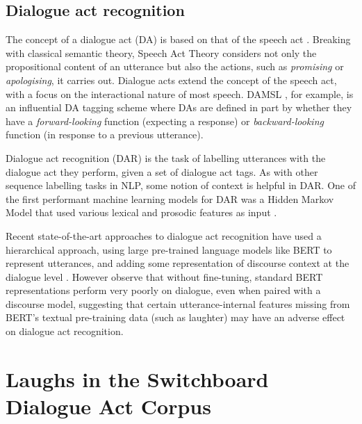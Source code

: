 \documentclass[11pt,a4paper]{article}
\begin{document}

\subsection{Dialogue act recognition}
\label{sec:dial-act-recogn}

The concept of a dialogue act (DA) is based on that of the speech act
\citep{austin1975things}. %
Breaking with classical semantic
theory, Speech Act Theory considers not only the propositional content
of an utterance but also the actions, such as \emph{promising} or
\emph{apologising}, it carries out.  Dialogue acts extend the concept
of the speech act, with a focus on the interactional nature of most
speech.  DAMSL \citep{coreCodingDialogsDAMSL1997}, for example, is an
influential DA tagging scheme where DAs are
defined in part by whether they have a \emph{forward-looking} function
(expecting a response) or \emph{backward-looking} function (in
response to a previous utterance).

Dialogue act recognition (DAR) is the task of labelling utterances with
the dialogue act they perform, given a set of dialogue act tags.  As
with other sequence labelling tasks in NLP, some notion of context is
helpful in DAR.  One of the first performant machine learning models
for DAR was a Hidden Markov Model that used various lexical and
prosodic features as input \citep{stolckeDialogueActModeling2000}.

Recent state-of-the-art approaches to dialogue act recognition
have used a hierarchical approach, using large pre-trained language models like BERT to represent utterances, and adding some representation of discourse context at the dialogue level \citep[e.g.,][]{Ribeiro2019,mehriPretrainingMethodsDialog2019}.
However \citet{darbert} observe that without fine-tuning,
standard BERT representations perform very poorly on dialogue,
even when paired with a discourse model,
suggesting that certain utterance-internal features missing
from BERT's textual pre-training data (such as laughter) 
may have an adverse effect on dialogue act recognition.




\section{Laughs in the Switchboard Dialogue Act Corpus}
\label{sec:corpus}
\end{document}
